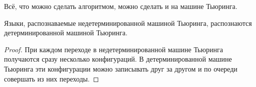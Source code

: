 \begin{statement}
Всё, что можно сделать алгоритмом, можно сделать и на машине Тьюринга.
\end{statement}

\begin{statement}
Языки, распознаваемые недетерминированной машиной Тьюринга, распознаются детерминированной машиной Тьюринга.
\end{statement}
\begin{proof}
При каждом переходе в недетерминированной машине Тьюринга получаются сразу несколько конфигураций.
В детерминированной машине Тьюринга эти конфигурации можно записывать друг за другом и по очереди совершать из них переходы.
\end{proof}